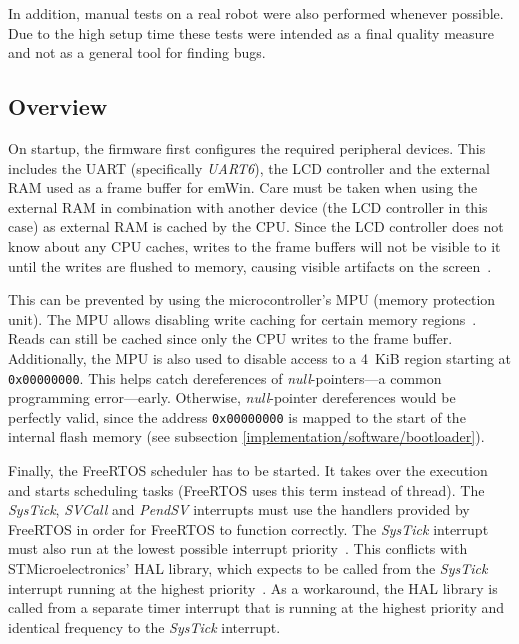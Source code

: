 In addition, manual tests on a real robot were also performed whenever possible. Due to the high
setup time these tests were intended as a final quality measure and not as a general tool for finding
bugs.

\subsection{Overview}
\label{implementation/software/overview}

On startup, the firmware first configures the required peripheral devices. This includes the UART
(specifically \textit{UART6}), the LCD controller and the external RAM used as a frame buffer for emWin.
Care must be taken when using the external RAM in combination with another device (the LCD controller
in this case) as external RAM is cached by the CPU. Since the LCD controller does not know about
any CPU caches, writes to the frame buffers will not be visible to it until the writes are flushed
to memory, causing visible artifacts on the screen~\cite{mcu-ref-manual}.

This can be prevented by using the microcontroller's MPU (memory protection unit). The MPU allows
disabling write caching for certain memory regions~\cite{mcu-ref-manual}. Reads can still be cached
since only the CPU writes to the frame buffer. Additionally, the MPU is also used to disable access
to a \SI{4}{KiB} region starting at \lstinline{0x00000000}. This helps catch dereferences of 
\textit{null}-pointers---a common programming error---early. Otherwise, \textit{null}-pointer
dereferences would be perfectly valid, since the address \lstinline{0x00000000} is mapped to the
start of the internal flash memory (see subsection \ref{implementation/software/bootloader}).

Finally, the FreeRTOS scheduler has to be started. It takes over the execution and starts scheduling
tasks (FreeRTOS uses this term instead of thread). The \textit{SysTick}, \textit{SVCall} and
\textit{PendSV} interrupts must use the handlers provided by FreeRTOS in order for FreeRTOS to
function correctly. The \textit{SysTick} interrupt must also run at the lowest possible interrupt
priority~\cite{freertos-arm-cortex-m}. This conflicts with STMicroelectronics' HAL library, which
expects to be called from the \textit{SysTick} interrupt running at the highest priority~\cite{stm32-hal-docs}.
As a workaround, the HAL library is called from a separate timer interrupt that is running at the
highest priority and identical frequency to the \textit{SysTick} interrupt.

